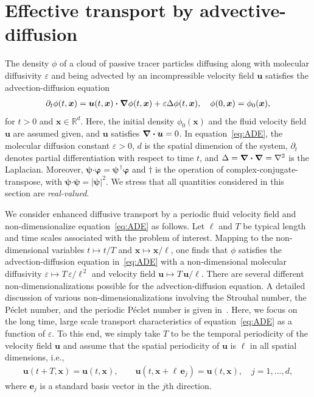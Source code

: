\documentclass[leqno,onefignum,onetabnum]{siamltex1213}
\newcommand\bnabla{\mbox{\boldmath${\nabla}$}}
\providecommand\bcdot{\boldsymbol{\cdot}}
\newcommand{\vecx}{\boldsymbol{x}}
\newcommand{\vecu}{\boldsymbol{u}}
\newcommand{\vece}{\boldsymbol{e}}
\newcommand{\vecpsi}{\boldsymbol{\psi}}
\newcommand{\vecvarphi}{\boldsymbol{\varphi}}
\begin{document}
\section{Effective transport by
  advective-diffusion} \label{sec:Eff_Trans}    
%
The density $\phi$ of a cloud of passive tracer particles diffusing along
with molecular diffusivity $\varepsilon$ and being advected by an incompressible
velocity field $\vecu$ satisfies the advection-diffusion equation
%
\begin{align}\label{eq:ADE}
  \partial_t\phi(t,\vecx)
    =\vecu (t,\vecx)\bcdot\bnabla \phi(t,\vecx)+\varepsilon\Delta \phi(t,\vecx),
  \quad
  \phi(0,\vecx)=\phi_0(\vecx),  
\end{align}
%
for $t>0$ and $\vecx\in\mathbb{R}^d$.
Here, the initial density $\phi_0(\vecx)$ and the fluid velocity field
$\vecu$ are assumed given, and $\vecu$ satisfies $\bnabla\bcdot\vecu=0$.
In equation~\eqref{eq:ADE}, the molecular diffusion constant $\varepsilon>0$,
$d$ is the spatial dimension of the 
system, $\partial_t$ denotes partial differentiation with respect to time
$t$, and $\Delta=\bnabla\bcdot\bnabla =\nabla^2$ is the Laplacian. Moreover, 
$\vecpsi\bcdot\vecvarphi=\vecpsi^{\,\dagger}\vecvarphi$ and $\dagger$ is the
operation of complex-conjugate-transpose, with
$\vecpsi\bcdot\vecpsi=|\vecpsi|^2$. We stress that all quantities 
considered in this section are \emph{real-valued}. 




We consider enhanced diffusive transport by a periodic fluid velocity
field and non-dimensionalize equation~\eqref{eq:ADE} as follows. Let
$\ell$ and $T$ be typical length and time scales associated with the
problem of interest. Mapping to the non-dimensional variables
$t\mapsto t/T$ and $\vecx\mapsto \vecx/\ell$,
one finds that $\phi$ satisfies the advection-diffusion equation
in~\eqref{eq:ADE} with a non-dimensional molecular diffusivity 
$\varepsilon\mapsto T\,\varepsilon/\ell^{\,2}$ and velocity field $\vecu\mapsto T\,\vecu /\ell$. There are
several different non-dimensionalizations possible 
for the advection-diffusion equation. A detailed discussion of 
various non-dimensionalizations involving the Strouhal number, the
P\'{e}clet number, and the periodic P\'{e}clet number is given
in~\cite{McLaughlin:Forest:PF:1999:880,Majda:Kramer:1999:book}.  Here,
we focus on the long time, large scale transport characteristics of
equation~\eqref{eq:ADE} as a function of $\varepsilon$. To this end, we simply
take $T$ to be the temporal periodicity of the velocity field $\vecu$
and assume that the spatial periodicity of $\vecu$ is $\ell$ in all
spatial dimensions, i.e., 
%
\begin{align}\label{eq:Periodic_u}
  \vecu(t+T,\vecx)=\vecu(t,\vecx), \qquad
  \vecu(t,\vecx+\ell\,\vece_j)=\vecu(t,\vecx), \quad
  j=1,\ldots,d,
\end{align}
%
where $\vece_j$ is a standard basis vector in the $j$th direction. 
\end{document}
